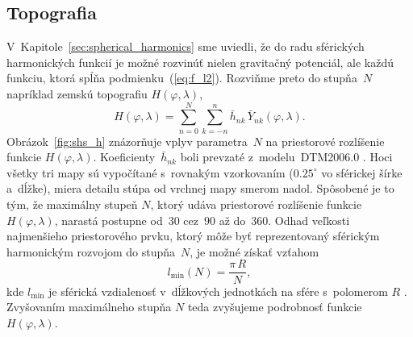 \documentclass[a4paper, 12pt]{book}
\begin{document}
\subsection{Topografia}
\label{sec:sh_applications_topography}

V~Kapitole~\ref{sec:spherical_harmonics} sme uviedli, že do radu sférických
harmonických funkcií je možné rozvinúť nielen gravitačný potenciál, ale každú
funkciu, ktorá spĺňa podmienku~(\ref{eq:f_l2}).  Rozviňme preto do stupňa~$N$ 
napríklad zemskú topografiu $H(\varphi, \lambda)$,
%
\begin{equation}
\label{eq:h_shs}
H(\varphi, \lambda) = \sum_{n = 0}^{N} \sum_{k = -n}^n \bar{h}_{nk} \,
\bar{Y}_{nk}(\varphi, \lambda){.}
\end{equation}
%
Obrázok~\ref{fig:shs_h} znázorňuje vplyv parametra~$N$ na priestorové 
rozlíšenie funkcie $H(\varphi, \lambda)$.  Koeficienty~$\bar{h}_{nk}$ boli 
prevzaté z~modelu~DTM2006.0 \parencite{DTM2006}.  Hoci všetky tri mapy sú 
vypočítané s~rovnakým vzorkovaním ($0.25^{\circ}$ vo sférickej šírke a~dĺžke), 
miera detailu stúpa od vrchnej mapy smerom nadol.  Spôsobené je to tým, že 
maximálny stupeň $N$, ktorý udáva priestorové rozlíšenie funkcie 
$H(\varphi,\lambda)$, narastá postupne od~$30$ cez~$90$ až do~$360$.  Odhad 
veľkosti najmenšieho priestorového prvku, ktorý môže byť reprezentovaný 
sférickým harmonickým rozvojom do stupňa~$N$, je možné získať vzťahom
%
\begin{equation}
l_{\min}(N) = \frac{\pi \, R}{N}{,}
\end{equation}
%
kde $l_{\min}$ je sférická vzdialenosť v~dĺžkových jednotkách na sfére 
s~polomerom $R$ \parencite{Barthelmes2013}.  Zvyšovaním
maximálneho stupňa $N$ teda zvyšujeme podrobnosť funkcie $H(\varphi, \lambda)$.
\end{document}
